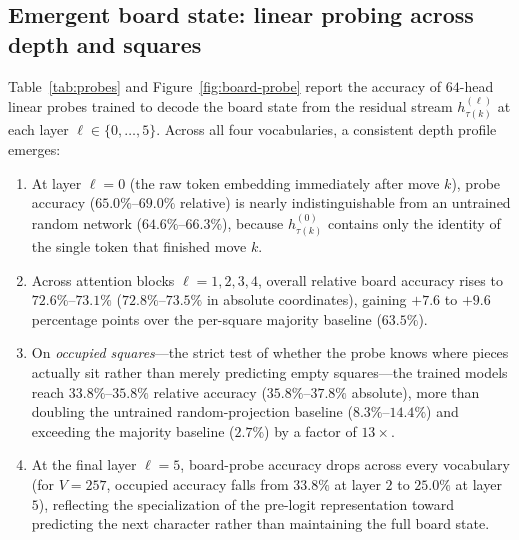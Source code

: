 \documentclass[11pt]{article}
\begin{document}
\subsection{Emergent board state: linear probing across depth and squares}
\label{sec:res-probes}

Table~\ref{tab:probes} and Figure~\ref{fig:board-probe} report the accuracy of $64$-head linear probes trained to decode the board state from the residual stream $h^{(\ell)}_{\tau(k)}$ at each layer $\ell \in \{0, \dots, 5\}$. Across all four vocabularies, a consistent depth profile emerges:
\begin{enumerate}
\item At layer $\ell=0$ (the raw token embedding immediately after move $k$), probe accuracy ($65.0\%$--$69.0\%$ relative) is nearly indistinguishable from an untrained random network ($64.6\%$--$66.3\%$), because $h^{(0)}_{\tau(k)}$ contains only the identity of the single token that finished move $k$.
\item Across attention blocks $\ell = 1, 2, 3, 4$, overall relative board accuracy rises to $72.6\%$--$73.1\%$ ($72.8\%$--$73.5\%$ in absolute coordinates), gaining $+7.6$ to $+9.6$ percentage points over the per-square majority baseline ($63.5\%$).
\item On \emph{occupied squares}---the strict test of whether the probe knows where pieces actually sit rather than merely predicting empty squares---the trained models reach $33.8\%$--$35.8\%$ relative accuracy ($35.8\%$--$37.8\%$ absolute), more than doubling the untrained random-projection baseline ($8.3\%$--$14.4\%$) and exceeding the majority baseline ($2.7\%$) by a factor of $13\times$.
\item At the final layer $\ell=5$, board-probe accuracy drops across every vocabulary (for $V=257$, occupied accuracy falls from $33.8\%$ at layer $2$ to $25.0\%$ at layer $5$), reflecting the specialization of the pre-logit representation toward predicting the next character rather than maintaining the full board state.
\end{enumerate}
\end{document}
